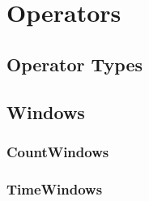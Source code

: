 \section{Operators}
\label{sect:Operators}


\subsection{Operator Types}


\subsection{Windows}

\subsubsection{CountWindows}

\subsubsection{TimeWindows}